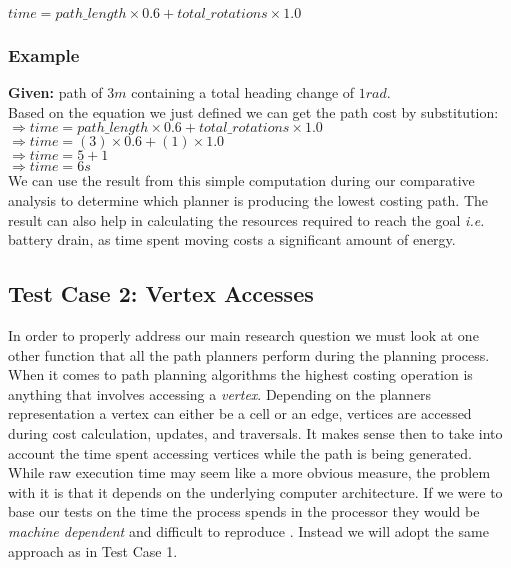 \indent $time = path\_length \times 0.6 + total\_rotations \times 1.0$ \\

\newpage

\subsubsection{Example}

\noindent
\textbf{Given:} path of $3m$ containing a total heading change of $1rad$. \\

\noindent
Based on the equation we just defined we can get the path cost by substitution: \\

\indent $\Rightarrow time = path\_length \times 0.6 + total\_rotations \times 1.0$ \\
\indent $\Rightarrow time = (3) \times 0.6 + (1) \times 1.0$ \\
\indent $\Rightarrow time = 5 + 1$ \\
\indent $\Rightarrow time = 6s$ \\

\noindent
We can use the result from this simple computation during our comparative analysis to determine which planner is producing the lowest costing path. The result can also help in calculating the resources required to reach the goal \textit{i.e.} battery drain, as time spent moving costs a significant amount of energy.

\subsection{Test Case 2: Vertex Accesses}\label{test 2}

\noindent
In order to properly address our main research question we must look at one other function that all the path planners perform during the planning process. When it comes to path planning algorithms the highest costing operation is anything that involves accessing a \textit{vertex}. Depending on the planners representation a vertex can either be a cell or an edge, vertices are accessed during cost calculation, updates, and traversals. It makes sense then to take into account the time spent accessing vertices while the path is being generated. \\

\noindent
While raw execution time may seem like a more obvious measure, the problem with it is that it depends on the underlying computer architecture. If we were to base our tests on the time the process spends in the processor they would be \textit{machine dependent} and difficult to reproduce \cite{FIELD2}. Instead we will adopt the same approach as in Test Case 1. \\

